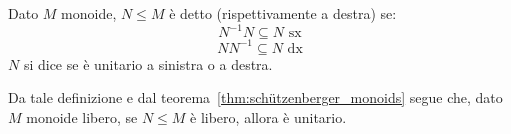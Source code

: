 \begin{definition}
  Dato \(M\) monoide, \(N \leq M\) è detto  (rispettivamente a destra) se:
  \[N^{-1}N \subseteq N \text{ sx}\]
  \[NN^{-1} \subseteq N \text{ dx}\]
  \(N\) si dice  se è unitario a sinistra o a destra.
\end{definition}

Da tale definizione e dal teorema~\ref{thm:schützenberger_monoids} segue che, dato \(M\) monoide libero, se \(N \leq M\) è libero, allora è unitario.

